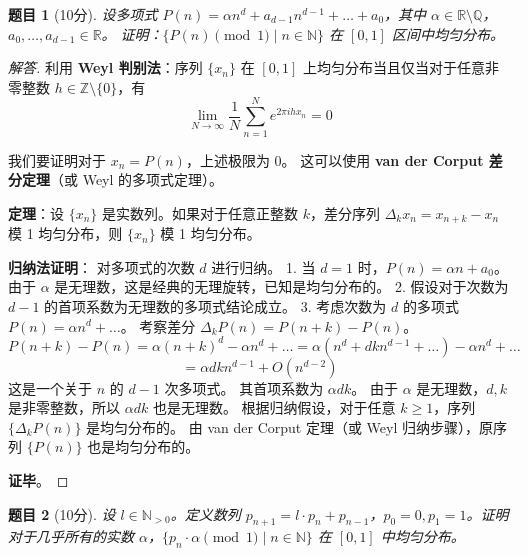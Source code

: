 \documentclass[a4paper,12pt]{article}
\newtheorem{problem}{题目}
\newenvironment{solution}{\begin{proof}[解答]}{\end{proof}}
\begin{document}
\begin{problem}[10分]
    设多项式 $P(n) = \alpha n^d + a_{d-1}n^{d-1} + \dots + a_0$，其中 $\alpha \in \mathbb{R} \setminus \mathbb{Q}$，$a_0, \dots, a_{d-1} \in \mathbb{R}$。
    证明：$\{P(n) \pmod 1 \mid n \in \mathbb{N}\}$ 在 $[0, 1]$ 区间中均匀分布。
\end{problem}

\begin{solution}
    利用 \textbf{Weyl 判别法}：序列 $\{x_n\}$ 在 $[0,1]$ 上均匀分布当且仅当对于任意非零整数 $h \in \mathbb{Z} \setminus \{0\}$，有
    $$
    \lim_{N \to \infty} \frac{1}{N} \sum_{n=1}^N e^{2\pi i h x_n} = 0
    $$
    
    我们要证明对于 $x_n = P(n)$，上述极限为 0。
    这可以使用 \textbf{van der Corput 差分定理}（或 Weyl 的多项式定理）。
    
    \textbf{定理}：设 $\{x_n\}$ 是实数列。如果对于任意正整数 $k$，差分序列 $\Delta_k x_n = x_{n+k} - x_n$ 模 1 均匀分布，则 $\{x_n\}$ 模 1 均匀分布。
    
    \textbf{归纳法证明}：
    对多项式的次数 $d$ 进行归纳。
    1. 当 $d=1$ 时，$P(n) = \alpha n + a_0$。由于 $\alpha$ 是无理数，这是经典的无理旋转，已知是均匀分布的。
    2. 假设对于次数为 $d-1$ 的首项系数为无理数的多项式结论成立。
    3. 考虑次数为 $d$ 的多项式 $P(n) = \alpha n^d + \dots$。
       考察差分 $\Delta_k P(n) = P(n+k) - P(n)$。
       $$
       P(n+k) - P(n) = \alpha(n+k)^d - \alpha n^d + \dots = \alpha(n^d + d k n^{d-1} + \dots) - \alpha n^d + \dots
       $$
       $$
       = \alpha d k n^{d-1} + O(n^{d-2})
       $$
       这是一个关于 $n$ 的 $d-1$ 次多项式。
       其首项系数为 $\alpha d k$。
       由于 $\alpha$ 是无理数，$d, k$ 是非零整数，所以 $\alpha d k$ 也是无理数。
       根据归纳假设，对于任意 $k \ge 1$，序列 $\{\Delta_k P(n)\}$ 是均匀分布的。
       由 van der Corput 定理（或 Weyl 归纳步骤），原序列 $\{P(n)\}$ 也是均匀分布的。
       
    \textbf{证毕}。
\end{solution}

\begin{problem}[10分]
    设 $l \in \mathbb{N}_{>0}$。定义数列 $p_{n+1} = l \cdot p_n + p_{n-1}$，$p_0=0, p_1=1$。证明对于几乎所有的实数 $\alpha$，$\{p_n \cdot \alpha \pmod 1 \mid n \in \mathbb{N}\}$ 在 $[0, 1]$ 中均匀分布。
\end{problem}
\end{document}
